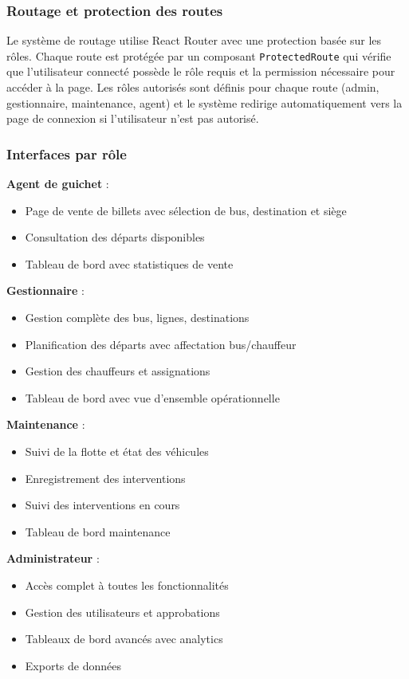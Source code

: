 \documentclass[a4paper, 12pt]{book}
\begin{document}
\subsubsection{Routage et protection des routes}

Le système de routage utilise React Router avec une protection basée sur les rôles. Chaque route est protégée par un composant \texttt{ProtectedRoute} qui vérifie que l'utilisateur connecté possède le rôle requis et la permission nécessaire pour accéder à la page. Les rôles autorisés sont définis pour chaque route (admin, gestionnaire, maintenance, agent) et le système redirige automatiquement vers la page de connexion si l'utilisateur n'est pas autorisé.

\subsubsection{Interfaces par rôle}

\textbf{Agent de guichet} :
\begin{itemize}
    \item Page de vente de billets avec sélection de bus, destination et siège
    \item Consultation des départs disponibles
    \item Tableau de bord avec statistiques de vente
\end{itemize}

\textbf{Gestionnaire} :
\begin{itemize}
    \item Gestion complète des bus, lignes, destinations
    \item Planification des départs avec affectation bus/chauffeur
    \item Gestion des chauffeurs et assignations
    \item Tableau de bord avec vue d'ensemble opérationnelle
\end{itemize}

\textbf{Maintenance} :
\begin{itemize}
    \item Suivi de la flotte et état des véhicules
    \item Enregistrement des interventions
    \item Suivi des interventions en cours
    \item Tableau de bord maintenance
\end{itemize}

\textbf{Administrateur} :
\begin{itemize}
    \item Accès complet à toutes les fonctionnalités
    \item Gestion des utilisateurs et approbations
    \item Tableaux de bord avancés avec analytics
    \item Exports de données
\end{itemize}
\end{document}
